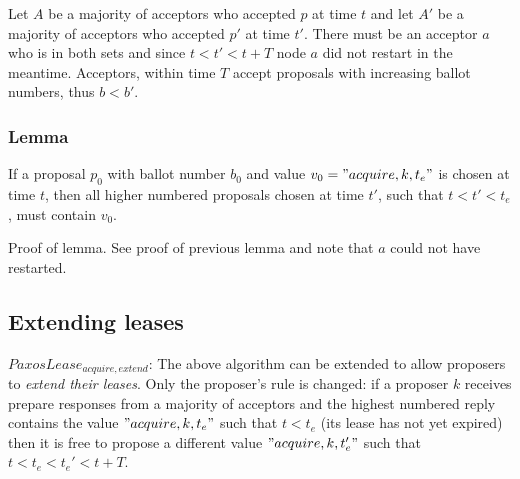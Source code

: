 \documentclass[12pt]{amsart}
\begin{document}
Let $A$ be a majority of acceptors who accepted $p$ at time $t$ and let $A'$ be a majority of acceptors who accepted $p'$ at time $t'$.  There must be an acceptor $a$ who is in both sets and since $t < t' < t + T$ node $a$ did not restart in the meantime. Acceptors, within time $T$ accept proposals with increasing ballot numbers, thus $b < b'$.

\subsubsection{ Lemma } If a proposal $p_0$ with ballot number $b_0$ and value $v_0 = "acquire, k, t_e"$ is chosen at time $t$, then all higher numbered proposals chosen at time $t'$, such that $t < t' < t_e$, must contain $v_0$.

Proof of lemma. See proof of previous lemma and note that $a$ could not have restarted.


\subsection{ Extending leases }

$PaxosLease_{acquire, extend}$: The above algorithm can be extended to allow proposers to \emph{extend their leases}. Only the proposer's rule is changed: if a proposer $k$ receives prepare responses from a majority of acceptors and the highest numbered reply contains the value $"acquire, k, t_e"$ such that $t < t_e$ (its lease has not yet expired) then it is free to propose a different value $"acquire, k, t_e'"$ such that $t < t_e < t_e' < t + T$.
\end{document}
